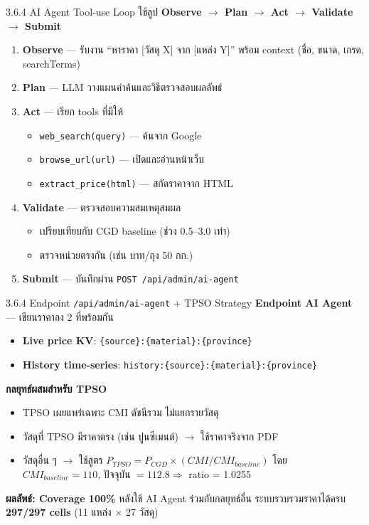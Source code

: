 \documentclass[aspectratio=169,11pt]{beamer}
\begin{document}
\begin{frame}{3.6.4 AI Agent Tool-use Loop}
  ใช้ลูป \textbf{Observe $\to$ Plan $\to$ Act $\to$ Validate $\to$ Submit}
  \begin{enumerate}
    \item \textbf{Observe} --- รับงาน ``หาราคา [วัสดุ X] จาก [แหล่ง Y]''
          พร้อม context (ชื่อ, ขนาด, เกรด, searchTerms)
    \item \textbf{Plan} --- LLM วางแผนคำค้นและวิธีตรวจสอบผลลัพธ์
    \item \textbf{Act} --- เรียก tools ที่มีให้
          \begin{itemize}
            \item \texttt{web\_search(query)} --- ค้นจาก Google
            \item \texttt{browse\_url(url)} --- เปิดและอ่านหน้าเว็บ
            \item \texttt{extract\_price(html)} --- สกัดราคาจาก HTML
          \end{itemize}
    \item \textbf{Validate} --- ตรวจสอบความสมเหตุสมผล
          \begin{itemize}
            \item เปรียบเทียบกับ CGD baseline (ช่วง 0.5--3.0 เท่า)
            \item ตรวจหน่วยตรงกัน (เช่น บาท/ถุง 50 กก.)
          \end{itemize}
    \item \textbf{Submit} --- บันทึกผ่าน \texttt{POST /api/admin/ai-agent}
  \end{enumerate}
\end{frame}

\begin{frame}{3.6.4 Endpoint \texttt{/api/admin/ai-agent} + TPSO Strategy}
  \footnotesize
  \textbf{Endpoint AI Agent} --- เขียนราคาลง 2 ที่พร้อมกัน
  \begin{itemize}
    \item \textbf{Live price KV}: \texttt{\{source\}:\{material\}:\{province\}}
    \item \textbf{History time-series}: \texttt{history:\{source\}:\{material\}:\{province\}}
  \end{itemize}
  \vspace{0.3em}
  \textbf{กลยุทธ์ผสมสำหรับ TPSO}
  \begin{itemize}
    \item TPSO เผยแพร่เฉพาะ CMI ดัชนีรวม ไม่แยกรายวัสดุ
    \item วัสดุที่ TPSO มีราคาตรง (เช่น ปูนซีเมนต์) $\to$ ใช้ราคาจริงจาก PDF
    \item วัสดุอื่น ๆ $\to$ ใช้สูตร
          $P_{TPSO} = P_{CGD} \times (CMI / CMI_{baseline})$
          โดย $CMI_{baseline} = 110$, ปัจจุบัน $= 112.8 \Rightarrow$ ratio = 1.0255
  \end{itemize}
  \vspace{0.3em}
  \begin{exampleblock}{\textbf{ผลลัพธ์: Coverage 100\%}}
    หลังใช้ AI Agent ร่วมกับกลยุทธ์อื่น ระบบรวบรวมราคาได้ครบ
    \textbf{297/297 cells} (11 แหล่ง $\times$ 27 วัสดุ)
  \end{exampleblock}
\end{frame}
\end{document}
